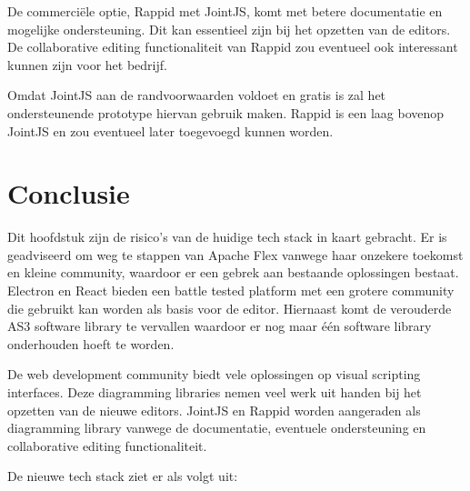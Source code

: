 De commerciële optie, Rappid met JointJS, komt met betere documentatie en mogelijke ondersteuning. Dit kan essentieel zijn bij het opzetten van de editors. De collaborative editing functionaliteit van Rappid zou eventueel ook interessant kunnen zijn voor het bedrijf.

Omdat JointJS aan de randvoorwaarden voldoet en gratis is zal het ondersteunende prototype hiervan gebruik maken. Rappid is een laag bovenop JointJS en zou eventueel later toegevoegd kunnen worden.

\section{Conclusie}
Dit hoofdstuk zijn de risico’s van de huidige tech stack in kaart gebracht. Er is geadviseerd om weg te stappen van Apache Flex vanwege haar onzekere toekomst en kleine community, waardoor er een gebrek aan bestaande oplossingen bestaat. Electron en React bieden een battle tested platform met een grotere community die gebruikt kan worden als basis voor de editor. Hiernaast komt de verouderde AS3 software library te vervallen waardoor er nog maar één software library onderhouden hoeft te worden.

De web development community biedt vele oplossingen op visual scripting interfaces. Deze diagramming libraries nemen veel werk uit handen bij het opzetten van de nieuwe editors. JointJS en Rappid worden aangeraden als diagramming library vanwege de documentatie, eventuele ondersteuning en collaborative editing functionaliteit.

De nieuwe tech stack ziet er als volgt uit: 

